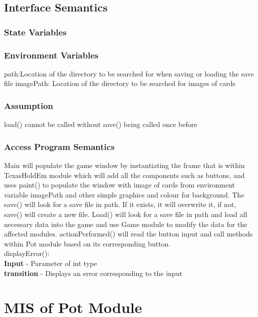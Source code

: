 \documentclass[11pt]{article}
\begin{document}
    \subsection{Interface Semantics}
    \subsubsection{State Variables}
    
    \subsubsection{Environment Variables}
	path:Location of the directory to be searched for when saving or loading the save file
	imagePath: Location of the directory to be searched for images of cards
    \subsubsection{Assumption}
    load() cannot be called without save() being called once before
    \subsubsection{Access Program Semantics}
    Main will populate the game window by instantiating the frame that is within TexasHoldEm module which will add all the components such as buttons, and uses paint() to populate the window with image of cards from environment variable imagePath and other simple graphics and colour for background. The save() will look for a save file in path. If it exists, it will overwrite it, if not, save() will create a new file. Load() will look for a save file in path and load all necessary data into the game and use Game module to modify the data for the affected modules. actionPerformed() will read the button input and call methods within Pot module based on its corresponding button. \\
    displayError():\\
    \textbf{Input} - Parameter of int type\\
    \textbf{transition} - Displays an error corresponding to the input  
    \newline
     \section{MIS of Pot Module}
     
\end{document}

